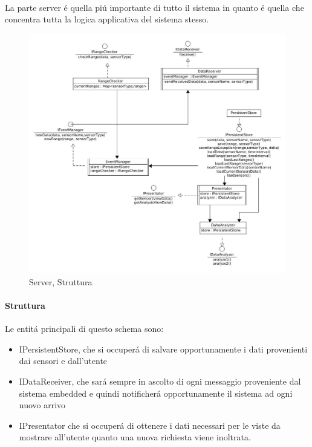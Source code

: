 \paragraph{}La parte server \'e quella pi\'u importante di tutto il sistema in quanto \'e quella che concentra tutta la logica applicativa del sistema stesso.

\begin{figure}[pH]
\centering
\includegraphics[width=\textwidth,height=\textheight,keepaspectratio]{Figures/DomainModel/Server/Structure.jpg}
\caption{Server, Struttura}
\end{figure}

\afterpage{\clearpage}

\newpage

\paragraph{Struttura}

Le entit\'a principali di questo schema sono:
\begin{itemize}
  \item IPersistentStore, che si occuper\'a di salvare opportunamente i dati provenienti dai sensori e dall'utente
  \item IDataReceiver, che sar\'a sempre in ascolto di ogni messaggio proveniente dal sistema embedded e quindi notificher\'a opportunamente il sistema ad ogni nuovo arrivo
  \item IPresentator che si occuper\'a di ottenere i dati necessari per le viste da mostrare all'utente quanto una nuova richiesta viene inoltrata.
\end{itemize}

